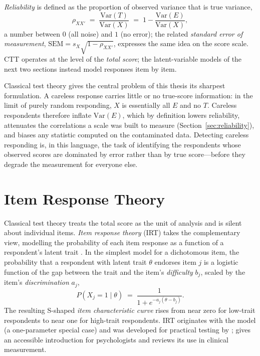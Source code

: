 \emph{Reliability} is defined as the proportion of observed variance that is
true variance,
\[
\rho_{XX'} \;=\; \frac{\mathrm{Var}(T)}{\mathrm{Var}(X)}
\;=\; 1 - \frac{\mathrm{Var}(E)}{\mathrm{Var}(X)},
\]
a number between $0$ (all noise) and $1$ (no error); the related
\emph{standard error of measurement}, $\mathrm{SEM} = s_X\sqrt{1-\rho_{XX'}}$,
expresses the same idea on the score scale. CTT operates at the level of the
\emph{total score}; the latent-variable models of the next two sections instead
model responses item by item.

Classical test theory gives the central problem of this thesis its sharpest
formulation. A careless response carries little or no true-score information:
in the limit of purely random responding, $X$ is essentially all $E$ and no
$T$. Careless respondents therefore inflate $\mathrm{Var}(E)$, which by
definition lowers reliability, attenuates the correlations a scale was built to
measure (Section~\ref{sec:reliability}), and biases any statistic computed on
the contaminated data. Detecting careless responding is, in this language, the
task of identifying the respondents whose observed scores are dominated by
error rather than by true score---before they degrade the measurement for
everyone else.

\section{Item Response Theory}
\label{sec:irt}

Classical test theory treats the total score as the unit of analysis and is
silent about individual items. \emph{Item response theory} (IRT) takes the
complementary view, modelling the probability of each item response as a
function of a respondent's latent trait \parencite{embretson2000item,
hambleton1991fundamentals}. In the simplest model for a dichotomous item, the
probability that a respondent with latent trait $\theta$ endorses item $j$ is a
logistic function of the gap between the trait and the item's \emph{difficulty}
$b_j$, scaled by the item's \emph{discrimination} $a_j$,
\begin{equation}
P(X_j = 1 \mid \theta) \;=\;
\frac{1}{1 + e^{-a_j(\theta - b_j)}} .
\label{eq:irt}
\end{equation}
The resulting S-shaped \emph{item characteristic curve} rises from near zero for
low-trait respondents to near one for high-trait respondents. IRT originates
with the \textcite{rasch1980probabilistic} model (a one-parameter special case)
and was developed for practical testing by \textcite{lord1980applications};
\textcite{edwards2009introduction} gives an accessible introduction for
psychologists and \textcite{reise2009item} reviews its use in clinical
measurement.

